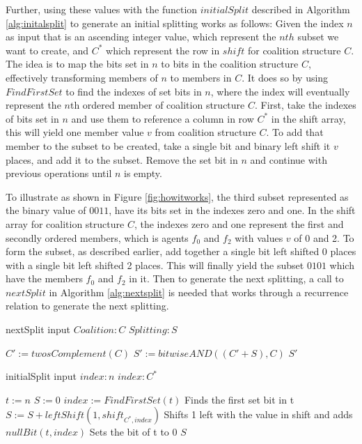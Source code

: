 \documentclass{llncs}
\begin{document}
Further, using these values with the function $initialSplit$ described in Algorithm \ref{alg:initalsplit} to generate an initial splitting works as follows: Given the index $n$ as input that is an ascending integer value, which represent the $nth$ subset we want to create, and $C^*$ which represent the row in $shift$ for coalition structure $C$. The idea is to map the  bits set in $n$ to bits in the coalition structure $C$, effectively transforming members of $n$ to members in $C$. It does so by using $Find First Set$ to find the indexes of set bits in $n$, where the index will eventually represent the $n$th ordered member of coalition structure $C$. First, take the indexes of bits set in $n$ and use them to reference a column in row $C^*$ in the shift array, this will yield one member value $v$ from coalition structure $C$. To add that member to the subset to be created, take a single bit and binary left shift it $v$ places, and add it to the subset. Remove the set bit in $n$ and continue with previous operations until $n$ is empty. 

To illustrate as shown in Figure \ref{fig:howitworks}, the third subset represented as the binary value of $0011$, have its bits set in the indexes zero and one. In the shift array for coalition structure $C$, the indexes zero and one represent the first and secondly ordered members, which is agents $f_0$ and $f_2$ with values $v$ of 0 and 2. To form the subset, as described earlier, add together a single bit left shifted 0 places with a single bit left shifted 2 places. This will finally yield the subset $0101$ which have the members $f_0$ and $f_2$ in it. Then to generate the next splitting, a call to $nextSplit$ in Algorithm \ref{alg:nextsplit} is needed that works through a recurrence relation to generate the next splitting.

\begin{algorithm}
\caption{ nextSplit input $Coalition:C$ $Splitting:S$\label{alg:nextsplit}}
\begin{algorithmic}[1]
\STATE $C' := twosComplement(C)$
\STATE $S' := bitwiseAND((C'+S),C)$
\RETURN $S'$
\end{algorithmic}
\end{algorithm}

\begin{algorithm}
\caption{initialSplit input $index:n$ $index:C^*$\label{alg:initalsplit}}
\begin{algorithmic}[1]
\STATE $t := n$
\STATE $S := 0$
 { 
\STATE $index := FindFirstSet(t)$ \hfill Finds the first set bit in t
\STATE $S := S + leftShift(1,shift_{C^*,index})$ \hfill Shifts 1 left with the value in shift and adds
\STATE $nullBit(t,index)$ \hfill Sets the bit of t to 0
}
\ENDWHILE
\RETURN $S$
\end{algorithmic}
\end{algorithm}
\end{document}
